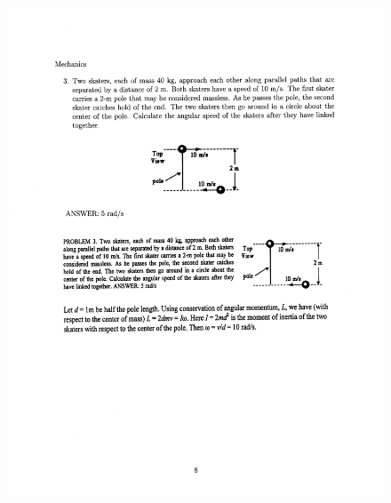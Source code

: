 \documentclass[10pt,a4paper]{article}
\begin{document}
\begin{figure}[H]
 \centering
 \includegraphics[width=16cm]{pdf/1-1T35.png}
\end{figure}
 \newpage
\end{document}
